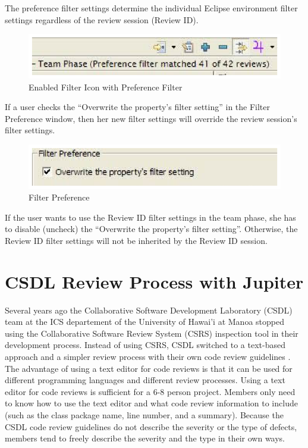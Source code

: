 The preference filter settings determine the individual Eclipse environment filter settings regardless of the review session (Review ID).

\begin{figure}[htbp]
  \centering
  \includegraphics{images/fig3-37.eps}
  \caption{Enabled Filter Icon with Preference Filter}
  \label{fig3-37}
\end{figure}

If a user checks the ``Overwrite the property's filter setting'' in the Filter Preference window, then her new filter settings will override the review session's filter settings.

\begin{figure}[htbp]
  \centering
  \includegraphics{images/fig3-38.eps}
  \caption{Filter Preference}
  \label{fig3-38}
\end{figure}

If the user wants to use the Review ID filter settings in the team phase, she has to disable (uncheck) the ``Overwrite the property's filter setting''. Otherwise, the Review ID filter settings will not be inherited by the Review ID session.

\section{CSDL Review Process with Jupiter}
\label{sec:csdl-review-process-with-jupiter}

Several years ago the Collaborative Software Development Laboratory (CSDL) team at the ICS departement of the University of Hawai'i at Manoa stopped using the Collaborative Software Review System (CSRS) inspection tool in their development process. Instead of using CSRS, CSDL switched to a text-based approach and a simpler review process with their own code review guidelines \cite{wiegers:seven}. The advantage of using a text editor for code reviews is that it can be used for different programming languages and different review processes. Using a text editor for code reviews is sufficient for a 6-8 person project. Members only need to know how to use the text editor and what code review information to include (such as the class package name, line number, and a summary). Because the CSDL code review guidelines do not describe the severity or the type of defects, members tend to freely describe the severity and the type in their own ways. 

